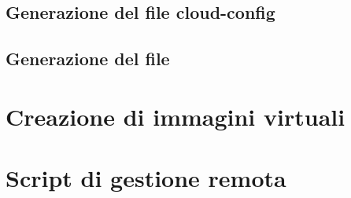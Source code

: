         \subsection{Generazione del file cloud-config} \label{subsec:cd;dci;generazione_cloud-config}
        
        \subsection{Generazione del file } \label{subsec:cd;dci;generazione_user-data}

    \section{Creazione di immagini virtuali} \label{sec:cd;creazione_immagini_virtuali}
    
    \section{Script di gestione remota} \label{sec:cd;script_gestione_remota}
    